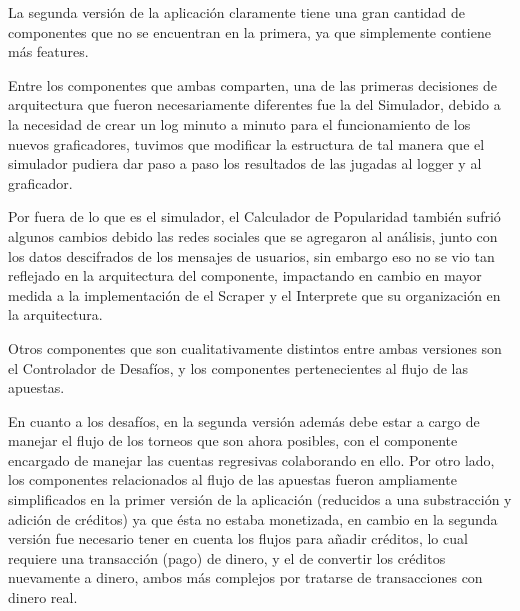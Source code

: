 La segunda versión de la aplicación claramente tiene una gran cantidad de componentes que no se encuentran en la primera, ya que simplemente contiene más features.

Entre los componentes que ambas comparten, una de las primeras decisiones de arquitectura que fueron necesariamente diferentes fue la del Simulador, debido a la necesidad de crear un log minuto a minuto para el funcionamiento de los nuevos graficadores, tuvimos que modificar la estructura de tal manera que el simulador pudiera dar paso a paso los resultados de las jugadas al logger y al graficador.

Por fuera de lo que es el simulador, el Calculador de Popularidad también sufrió algunos cambios debido las redes sociales que se agregaron al análisis, junto con los datos descifrados de los mensajes de usuarios, sin embargo eso no se vio tan reflejado en la arquitectura del componente, impactando en cambio en mayor medida a la implementación de el Scraper y el Interprete que su organización en la arquitectura.

Otros componentes que son cualitativamente distintos entre ambas versiones son el Controlador de Desafíos, y los componentes pertenecientes al flujo de las apuestas.

En cuanto a los desafíos, en la segunda versión además debe estar a cargo de manejar el flujo de los torneos que son ahora posibles, con el componente encargado de manejar las cuentas regresivas colaborando en ello. Por otro lado, los componentes relacionados al flujo de las apuestas fueron ampliamente simplificados en la primer versión de la aplicación (reducidos a una substracción y adición de créditos) ya que ésta no estaba monetizada, en cambio en la segunda versión fue necesario tener en cuenta los flujos para añadir créditos, lo cual requiere una transacción (pago) de dinero, y el de convertir los créditos nuevamente a dinero, ambos más complejos por tratarse de transacciones con dinero real.
